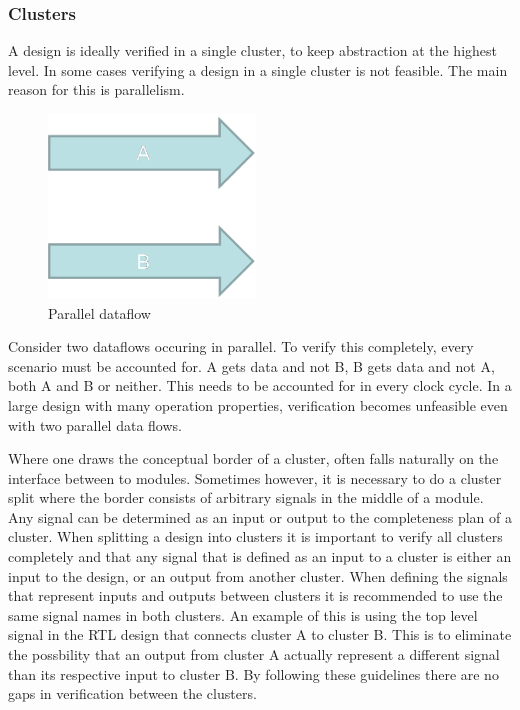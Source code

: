 \subsubsection{Clusters}
\label{subsub:clust}
A design is ideally verified in a single cluster, to keep abstraction at the highest level. In some cases verifying a design in a single cluster is not feasible. The main reason for this is parallelism.\\ 
\begin{figure}
\includegraphics[width=5.5cm]{figs/Verif/parallell.png}
\caption{Parallel dataflow}\label{fig:para}
\end{figure} 

Consider two dataflows occuring in parallel. To verify this completely, every scenario must be accounted for. A gets data and not B, B gets data and not A, both A and B or neither. This needs to be accounted for in every clock cycle. In a large design with many operation properties, verification becomes unfeasible even with two parallel data flows.     


Where one draws the conceptual border of a cluster, often falls naturally on the interface between to modules. Sometimes however, it is necessary to do a cluster split where the border consists of arbitrary signals in the middle of a module. Any signal can be determined as an input or output to the completeness plan of a cluster\cite{clust}. When splitting a design into clusters it is important to verify all clusters completely and that any signal that is defined as an input to a cluster is either an input to the design, or an output from another cluster. When defining the signals that represent inputs and outputs between clusters it is recommended to use the same signal names in both clusters. An example of this is using the top level signal in the RTL design that connects cluster A to cluster B. This is to eliminate the possbility that an output from cluster A actually represent a different signal than its respective input to cluster B. By following these guidelines there are no gaps in verification between the clusters. 



